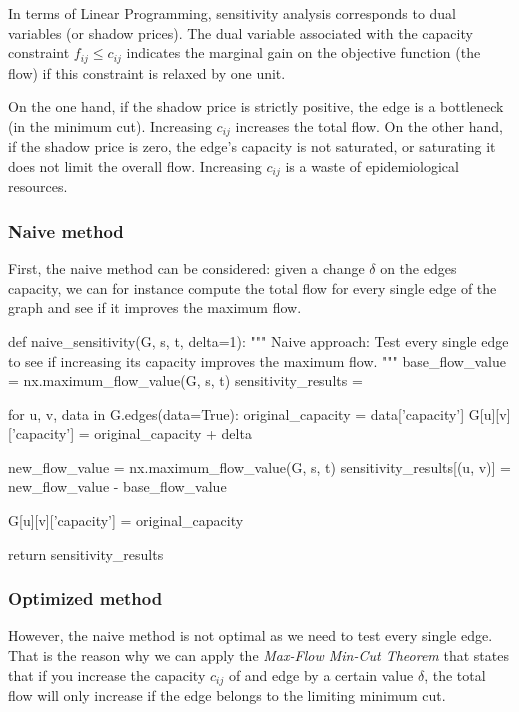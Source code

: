 \documentclass[12pt, openany]{article}
\begin{document}
In terms of Linear Programming, sensitivity analysis corresponds to dual variables (or shadow prices). The dual variable associated with the capacity constraint $f_{ij} \leq c_{ij}$ indicates the marginal gain on the objective function (the flow) if this constraint is relaxed by one unit.

On the one hand, if the shadow price is strictly positive, the edge is a bottleneck (in the minimum cut). Increasing $c_{ij}$ increases the total flow. On the other hand, if the shadow price is zero, the edge's capacity is not saturated, or saturating it does not limit the overall flow. Increasing $c_{ij}$ is a waste of epidemiological resources.

\subsubsection{Naive method}\label{sec:1_naive_method}

First, the naive method can be considered: given a change $\delta$ on the edges capacity, we can for instance compute the total flow for every single edge of the graph and see if it improves the maximum flow.

\begin{python}[caption={Python code for the naive approach},  label={lst:1_naive_method_lst}]
def naive_sensitivity(G, s, t, delta=1):
    """
    Naive approach: Test every single edge to see if increasing its capacity improves the maximum flow.
    """
    base_flow_value = nx.maximum_flow_value(G, s, t)
    sensitivity_results = {}

    for u, v, data in G.edges(data=True):
        original_capacity = data['capacity']
        G[u][v]['capacity'] = original_capacity + delta
        
        new_flow_value = nx.maximum_flow_value(G, s, t)
        sensitivity_results[(u, v)] = new_flow_value - base_flow_value
        
        G[u][v]['capacity'] = original_capacity
        
    return sensitivity_results
\end{python}

\subsubsection{Optimized method}\label{sec:1_optimized_method}

However, the naive method is not optimal as we need to test every single edge. That is the reason why we can apply the \emph{Max-Flow Min-Cut Theorem} that states that if you increase the capacity $c_{ij}$ of and edge by a certain value $\delta$, the total flow will only increase if the edge belongs to the limiting minimum cut.
\end{document}
